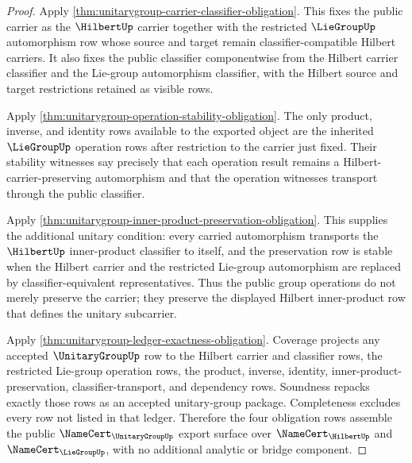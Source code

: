 \begin{proof}
Apply \autoref{thm:unitarygroup-carrier-classifier-obligation}. This fixes the public carrier as the $\HilbertUp$ carrier together with the restricted $\LieGroupUp$ automorphism row whose source and target remain classifier-compatible Hilbert carriers. It also fixes the public classifier componentwise from the Hilbert carrier classifier and the Lie-group automorphism classifier, with the Hilbert source and target restrictions retained as visible rows.

Apply \autoref{thm:unitarygroup-operation-stability-obligation}. The only product, inverse, and identity rows available to the exported object are the inherited $\LieGroupUp$ operation rows after restriction to the carrier just fixed. Their stability witnesses say precisely that each operation result remains a Hilbert-carrier-preserving automorphism and that the operation witnesses transport through the public classifier.

Apply \autoref{thm:unitarygroup-inner-product-preservation-obligation}. This supplies the additional unitary condition: every carried automorphism transports the $\HilbertUp$ inner-product classifier to itself, and the preservation row is stable when the Hilbert carrier and the restricted Lie-group automorphism are replaced by classifier-equivalent representatives. Thus the public group operations do not merely preserve the carrier; they preserve the displayed Hilbert inner-product row that defines the unitary subcarrier.

Apply \autoref{thm:unitarygroup-ledger-exactness-obligation}. Coverage projects any accepted $\UnitaryGroupUp$ row to the Hilbert carrier and classifier rows, the restricted Lie-group operation rows, the product, inverse, identity, inner-product-preservation, classifier-transport, and dependency rows. Soundness repacks exactly those rows as an accepted unitary-group package. Completeness excludes every row not listed in that ledger. Therefore the four obligation rows assemble the public $\NameCert_{\UnitaryGroupUp}$ export surface over $\NameCert_{\HilbertUp}$ and $\NameCert_{\LieGroupUp}$, with no additional analytic or bridge component.
\end{proof}

